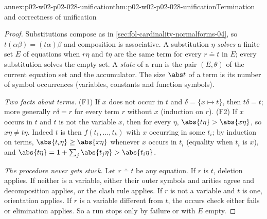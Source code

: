 \begin{annexitem}{annex:p02-w02-p02-028-unification}{thm:p02-w02-p02-028-unification}{Termination and correctness of unification}
\begin{proof}
Substitutions compose as in \cref{sec:fol-cardinality-normalforms-04}, so
\(t(\alpha\beta)=(t\alpha)\beta\) and composition is associative.  A
substitution \(\eta\) \emph{solves} a finite set \(E\) of equations when
\(r\eta\) and \(t\eta\) are the same term for every \(r\doteq t\) in \(E\); every
substitution solves the empty set.  A \emph{state} of a run is the pair
\((E,\theta)\) of the current equation set and the accumulator.  The size
\(\abs t\) of a term is its number of symbol occurrences (variables,
constants and function symbols).

\emph{Two facts about terms.}  (F1) If \(x\) does not occur in \(t\) and
\(\delta=\{x\mapsto t\}\), then \(t\delta=t\); more generally
\(r\delta=r\) for every term \(r\) without \(x\) (induction on \(r\)).  (F2) If
\(x\) occurs in \(t\) and \(t\) is not the variable \(x\), then for every
\(\eta\), \(\abs{t\eta}>\abs{x\eta}\), so \(x\eta\neq t\eta\).  Indeed \(t\) is
then \(f(t_1,\ldots,t_k)\) with \(x\) occurring in some \(t_i\); by induction on
terms, \(\abs{t_i\eta}\geq\abs{x\eta}\) whenever \(x\) occurs in \(t_i\)
(equality when \(t_i\) is \(x\)), and
\(\abs{t\eta}=1+\sum_j\abs{t_j\eta}>\abs{t_i\eta}\).

\emph{The procedure never gets stuck.}  Let \(r\doteq t\) be any equation.
If \(r\) is \(t\), deletion applies.  If neither is a variable, either their
outer symbols and arities agree and decomposition applies, or the clash rule
applies.  If \(r\) is not a variable and \(t\) is one, orientation applies.  If
\(r\) is a variable different from \(t\), the occurs check either fails or
elimination applies.  So a run stops only by failure or with \(E\) empty.


\end{proof}
\end{annexitem}
